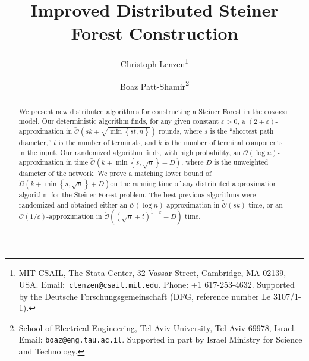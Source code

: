 \documentclass[letterpaper,11pt]{article}
\newcommand{\BO}{\mathcal{O}}
\newcommand{\sO}{\tilde{\mathcal{O}}}
\newcommand{\sOmega}{\tilde{\Omega}}
\newcommand{\Set}[1]{\left\{#1\right\}}
\newcommand{\Congest}{\textsc{congest}\xspace}
\begin{document}
\setcounter{tocdepth}{2}

\title{\textbf{Improved Distributed Steiner Forest Construction}
}

\author{
Christoph Lenzen\thanks{MIT CSAIL, The Stata Center, 32 Vassar Street,
Cambridge, MA 02139, USA.
\hbox{Email: {\tt clenzen@csail.mit.edu}.} Phone: +1 617-253-4632.
Supported by the Deutsche Forschungsgemeinschaft (DFG, reference
number Le 3107/1-1).}
\and 
Boaz Patt-Shamir\thanks{School of Electrical Engineering, Tel Aviv
  University, Tel Aviv 69978, Israel. Email:
  \texttt{boaz@eng.tau.ac.il}. Supported in part by Israel
  Ministry for Science and Technology.}
}

\date{}


\begin{titlepage}

\setcounter{page}{0}

\maketitle





\begin{abstract}
  We present new distributed algorithms for constructing a Steiner Forest in the
  \Congest model. Our deterministic algorithm finds, for any given constant
  $\varepsilon>0$, a $(2+\varepsilon)$-approximation in
  $\sO(sk+\sqrt{\min\Set{st,n}})$ rounds, where $s$ is the ``shortest path
  diameter,'' $t$ is the number of terminals, and $k$ is the number of terminal
  components in the input. Our randomized algorithm finds, with high
  probability, an $\BO(\log n)$-approximation in time $\sO(k+\min\Set{s,\sqrt
  n}+D)$, where $D$ is the unweighted diameter of the network. We prove a
  matching lower bound of $\sOmega(k+\min\Set{s,\sqrt
  n}+D)$on the running time of any distributed approximation
  algorithm for the Steiner Forest problem. The best previous algorithms were
  randomized and obtained either an $\BO(\log n)$-approximation in $\sO(sk)$
  time, or an $\BO(1/\varepsilon)$-approximation in $\sO((\sqrt
  n+t)^{1+\varepsilon}+D)$ time.
\end{abstract} 
\thispagestyle{empty}
\end{titlepage}
\end{document}
